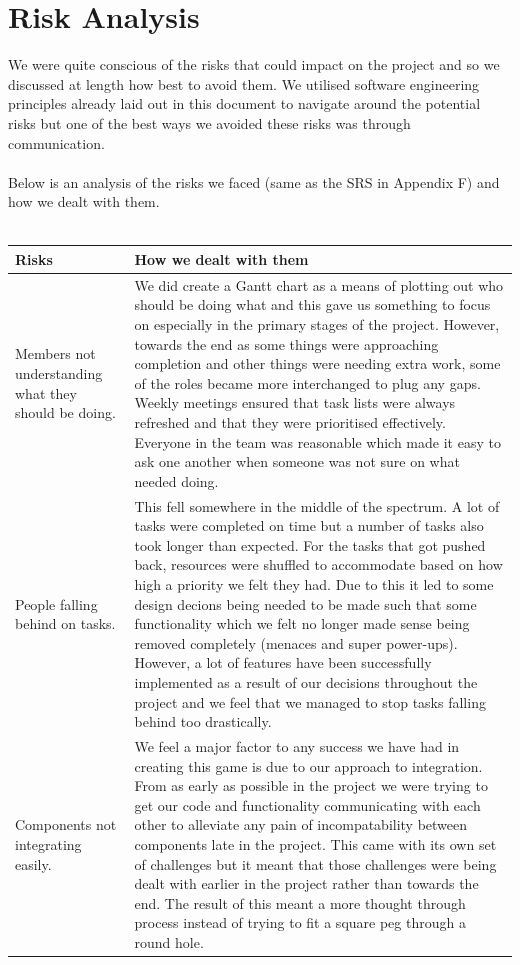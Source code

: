 \documentclass[12pt]{article}
\newcommand{\return}{\\\\\noindent}
\begin{document}
\section{Risk Analysis}
We were quite conscious of the risks that could impact on the project and so we discussed at length how best to avoid them. We utilised software engineering principles already laid out in this document to navigate around the potential risks but one of the best ways we avoided these risks was through communication. \return
Below is an analysis of the risks we faced (same as the SRS in Appendix F) and how we dealt with them.\return
\begin{tabularx}{\textwidth}{|p{4cm}|X|} \hline
Risks & How we dealt with them \\ \hline
Members not understanding what they should be doing. &  We did create a Gantt chart as a means of plotting out who should be doing what and this gave us something to focus on especially in the primary stages of the project. However, towards the end as some things were approaching completion and other things were needing extra work, some of the roles became more interchanged to plug any gaps. Weekly meetings ensured that task lists were always refreshed and that they were prioritised effectively. Everyone in the team was reasonable which made it easy to ask one another when someone was not sure on what needed doing. \\ \hline
People falling behind on tasks. & This fell somewhere in the middle of the spectrum. A lot of tasks were completed on time but a number of tasks also took longer than expected. For the tasks that got pushed back, resources were shuffled to accommodate based on how high a priority we felt they had. Due to this it led to some design decions being needed to be made such that some functionality which we felt no longer made sense being removed completely (menaces and super power-ups). However, a lot of features have been successfully implemented as a result of our decisions throughout the project and we feel that we managed to stop tasks falling behind too drastically. \\ \hline
Components not integrating easily. & We feel a major factor to any success we have had in creating this game is due to our approach to integration. From as early as possible in the project we were trying to get our code and functionality communicating with each other to alleviate any pain of incompatability between components late in the project. This came with its own set of challenges but it meant that those challenges were being dealt with earlier in the project rather than towards the end. The result of this meant a more thought through process instead of trying to fit a square peg through a round hole.\\ \hline

\end{tabularx}
\end{document}
